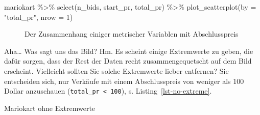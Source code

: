 \documentclass[
  letterpaper,
  twoside,
  open=any]{scrbook}
\newenvironment{Shaded}{\begin{snugshade}}{\end{snugshade}}
\newcommand{\AttributeTok}[1]{\textcolor[rgb]{0.40,0.45,0.13}{#1}}
\newcommand{\DecValTok}[1]{\textcolor[rgb]{0.68,0.00,0.00}{#1}}
\newcommand{\FunctionTok}[1]{\textcolor[rgb]{0.28,0.35,0.67}{#1}}
\newcommand{\NormalTok}[1]{\textcolor[rgb]{0.00,0.23,0.31}{#1}}
\newcommand{\OtherTok}[1]{\textcolor[rgb]{0.00,0.23,0.31}{#1}}
\newcommand{\SpecialCharTok}[1]{\textcolor[rgb]{0.37,0.37,0.37}{#1}}
\newcommand{\StringTok}[1]{\textcolor[rgb]{0.13,0.47,0.30}{#1}}
\theoremstyle{definition}
\theoremstyle{definition}
\theoremstyle{definition}
\theoremstyle{remark}
\begin{document}
\begin{Shaded}
\begin{Highlighting}[]
\NormalTok{mariokart }\SpecialCharTok{\%\textgreater{}\%} 
  \FunctionTok{select}\NormalTok{(n\_bids, start\_pr, total\_pr) }\SpecialCharTok{\%\textgreater{}\%} 
  \FunctionTok{plot\_scatterplot}\NormalTok{(}\AttributeTok{by =} \StringTok{"total\_pr"}\NormalTok{, }\AttributeTok{nrow =} \DecValTok{1}\NormalTok{)}
\end{Highlighting}
\end{Shaded}

\begin{figure}[H]


\caption{\label{fig-mario-scatter}Der Zusammenhang einiger metrischer
Variablen mit Abschlusspreis}

\end{figure}%

Aha\ldots{} Was sagt uns das Bild? Hm. Es scheint einige Extremwerte zu
geben, die dafür sorgen, dass der Rest der Daten recht
zusammengequetscht auf dem Bild erscheint. Vielleicht sollten Sie solche
Extremwerte lieber entfernen? Sie entscheiden sich, nur Verkäufe mit
einem Abschlusspreis von weniger als 100 Dollar anzuschauen
(\texttt{total\_pr\ \textless{}\ 100}), s. Listing~\ref{lst-no-extreme}.

\begin{codelisting}

\caption{\label{lst-no-extreme}Mariokart ohne Extremwerte}

\centering{

\begin{Shaded}
\begin{Highlighting}[]
\NormalTok{mariokart\_no\_extreme }\OtherTok{\textless{}{-}}
\NormalTok{  mariokart }\SpecialCharTok{\%\textgreater{}\%} 
  \FunctionTok{filter}\NormalTok{(total\_pr }\SpecialCharTok{\textless{}} \DecValTok{100}\NormalTok{)}
\end{Highlighting}
\end{Shaded}

}

\end{codelisting}%
\end{document}

